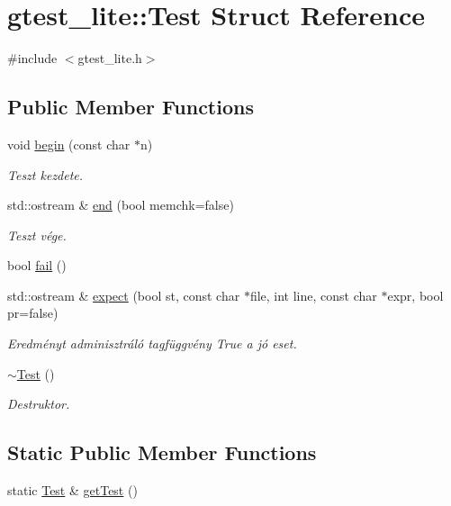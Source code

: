 \hypertarget{structgtest__lite_1_1_test}{}\section{gtest\+\_\+lite\+::Test Struct Reference}
\label{structgtest__lite_1_1_test}


{\ttfamily \#include $<$gtest\+\_\+lite.\+h$>$}

\subsection*{Public Member Functions}
\begin{DoxyCompactItemize}
\item 
void \mbox{\hyperlink{structgtest__lite_1_1_test_a2227b70fcc5dfb3c326bf117dd8f7e79}{begin}} (const char $\ast$n)
\begin{DoxyCompactList}\small\item\em Teszt kezdete. \end{DoxyCompactList}\item 
std\+::ostream \& \mbox{\hyperlink{structgtest__lite_1_1_test_a658c1eee35f170294c354ebf4d3fc1ba}{end}} (bool memchk=false)
\begin{DoxyCompactList}\small\item\em Teszt vége. \end{DoxyCompactList}\item 
bool \mbox{\hyperlink{structgtest__lite_1_1_test_aadbfd0f53c56d975f793602996631195}{fail}} ()
\item 
std\+::ostream \& \mbox{\hyperlink{structgtest__lite_1_1_test_a0bca03315e5963f7fdfffd92d2daed6a}{expect}} (bool st, const char $\ast$file, int line, const char $\ast$expr, bool pr=false)
\begin{DoxyCompactList}\small\item\em Eredményt adminisztráló tagfüggvény True a jó eset. \end{DoxyCompactList}\item 
\mbox{\hyperlink{structgtest__lite_1_1_test_a5a879233c2aa110626668c06140f6e71}{$\sim$\+Test}} ()
\begin{DoxyCompactList}\small\item\em Destruktor. \end{DoxyCompactList}\end{DoxyCompactItemize}
\subsection*{Static Public Member Functions}
\begin{DoxyCompactItemize}
\item 
static \mbox{\hyperlink{structgtest__lite_1_1_test}{Test}} \& \mbox{\hyperlink{structgtest__lite_1_1_test_a532aa4c5e33e41ce8139b9c9098aa6f2}{get\+Test}} ()
\end{DoxyCompactItemize}
